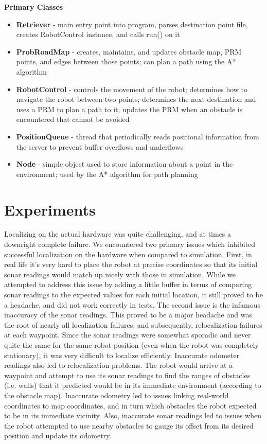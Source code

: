 \documentclass[12pt]{article}
\begin{document}
\textbf{Primary Classes}
\begin{itemize}
\item{\textbf{Retriever} - main entry point into program, parses destination point file, creates RobotControl instance, and calls run() on it}
\item{\textbf{ProbRoadMap} - creates, maintains, and updates obstacle map, PRM points, and edges between those points; 
                       can plan a path using the A* algorithm}
\item{\textbf{RobotControl} - controls the movement of the robot; determines how to navigate the robot between two points; 
                      determines the next destination and uses a PRM to plan a path to it; updates the PRM when an obstacle is encountered 
                      that cannot be avoided}
\item{\textbf{PositionQueue} - thread that periodically reads positional information from the server to prevent buffer overflows and underflows}
\item{\textbf{Node} - simple object used to store information about a point in the environment; used by the A* algorithm for path planning}
\end{itemize}


\section{Experiments}

Localizing on the actual hardware was quite challenging, and at times a downright complete failure. We encountered two primary issues which inhibited successful localization on the hardware when compared to simulation. First, in real life it's very hard to place the robot at precise coordinates so that its initial sonar readings would match up nicely with those in simulation. While we attempted to address this issue by adding a little buffer in terms of comparing sonar readings to the expected values for each initial location, it still proved to be a headache, and did not work correctly in tests. The second issue is the infamous inaccuracy of the sonar readings. This proved to be a major headache and was the root of nearly all localization failures, and subsequently, relocalization failures at each waypoint. Since the sonar readings were somewhat sporadic and never quite the  same for the same robot position (even when the robot was completely stationary), it was very difficult to localize efficiently. Inaccurate odometer readings also led to relocalization problems. The robot would arrive at a waypoint and attempt to use its sonar readings to find the ranges of obstacles (i.e. walls) that it predicted would be in its immediate environment (according to the obstacle map). Inaccurate odometry led to issues linking real-world coordinates to map coordinates, and in turn which obstacles the robot expected to be in its immediate vicinity. Also, inaccurate sonar readings led to issues when the robot attempted to use nearby obstacles to gauge its offset from its desired position and update its odometry.
\end{document}
